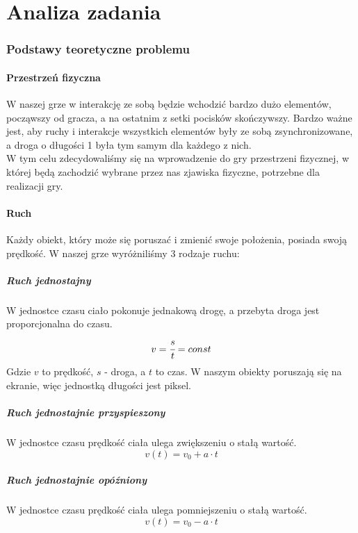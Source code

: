 \documentclass[a4paper,twoside]{article}
\begin{document}
	
	\newpage
	
	\part{\huge \textbf{Analiza zadania}}
	
	\section{Podstawy teoretyczne problemu}
		\subsection{Przestrzeń fizyczna}
			W naszej grze w interakcję ze sobą będzie wchodzić bardzo dużo elementów, począwszy od gracza, a na ostatnim z setki pocisków skończywszy. Bardzo ważne jest, aby ruchy i interakcje wszystkich elementów były ze sobą zsynchronizowane, a droga o długości 1 była tym samym dla każdego z nich.\\
			W tym celu zdecydowaliśmy się na wprowadzenie do gry przestrzeni fizycznej, w której będą zachodzić wybrane przez nas zjawiska fizyczne, potrzebne dla realizacji gry.
			
		\subsection{Ruch}
			Każdy obiekt, który może się poruszać i zmienić swoje położenia, posiada swoją prędkość. W naszej grze wyróżniliśmy 3 rodzaje ruchu:
			\subsubsection{Ruch jednostajny}
				W jednostce czasu ciało pokonuje jednakową drogę, a przebyta droga jest proporcjonalna do czasu.
				$$ v=\cfrac{s}{t}=const$$
				Gdzie $ v $ to prędkość, $ s $ - droga, a $ t $ to czas. W naszym obiekty poruszają się na ekranie, więc jednostką długości jest piksel.
			\subsubsection{Ruch jednostajnie przyspieszony}
				W jednostce czasu prędkość ciała ulega zwiększeniu o stałą wartość.
				$$ v(t)=v_0+a\cdot t $$
			\subsubsection{Ruch jednostajnie opóźniony}
				W jednostce czasu prędkość ciała ulega pomniejszeniu o stałą wartość.
				$$ v(t)=v_0-a\cdot t $$
			
\end{document}
